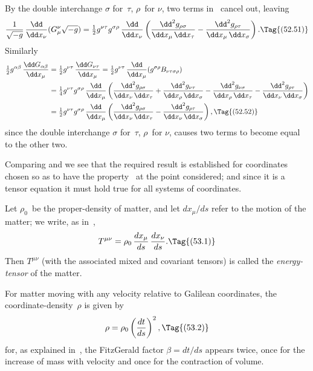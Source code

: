 \documentclass[12pt]{book}
\begin{document}
By the double interchange $\sigma$ for~$\tau$, $\rho$~for $\nu$, two terms in~ cancel out,
leaving
\[
\frac{1}{\sqrt{-g}}\, \frac{\dd}{\dd x_{\nu}} (G_{\mu}^{\nu} \sqrt{-g})
= \tfrac{1}{2} g^{\nu\tau} g^{\sigma\rho}\, \frac{\dd}{\dd x_{\nu}} \left(
    \frac{\dd^{2} g_{\rho\sigma}}{\dd x_{\mu}\, \dd x_{\tau}}
  - \frac{\dd^{2} g_{\rho\tau}}{\dd x_{\mu}\, \dd x_{\sigma}}\right).
\Tag{(52.51)}
\]
Similarly
\begin{align*}
  \tfrac{1}{2} g^{\alpha\beta}\, \frac{\dd G_{\alpha\beta}}{\dd x_{\mu}}
  &= \tfrac{1}{2} g^{\nu\tau}\, \frac{\dd G_{\nu\tau}}{\dd x_{\mu}}
  = \tfrac{1}{2} g^{\nu\tau}\, \frac{\dd}{\dd x_{\mu}} (g^{\sigma\rho} B_{\nu\tau\sigma\rho}) \\
  &= \tfrac{1}{4} g^{\nu\tau} g^{\sigma\rho}\, \frac{\dd}{\dd x_{\mu}}
  \left(\frac{\dd^{2} g_{\rho\sigma}}{\dd x_{\nu}\, \dd x_{\tau}}
  + \frac{\dd^{2} g_{\nu\tau}}{\dd x_{\rho}\, \dd x_{\sigma}}
  - \frac{\dd^{2} g_{\nu\sigma}}{\dd x_{\rho}\, \dd x_{\tau}}
  - \frac{\dd^{2} g_{\rho\tau}}{\dd x_{\nu}\, \dd x_{\sigma}}\right) \\
  &= \tfrac{1}{2} g^{\nu\tau} g^{\sigma\rho}\, \frac{\dd}{\dd x_{\mu}} \left(
    \frac{\dd^{2} g_{\rho\sigma}}{\dd x_{\nu}\, \dd x_{\tau}}
  - \frac{\dd^{2} g_{\rho\tau}}{\dd x_{\nu}\, \dd x_{\sigma}}\right),
  \Tag{(52.52)}
\end{align*}
since the double interchange $\sigma$ for~$\tau$, $\rho$~for $\nu$, causes two terms to become
equal to the other two.

Comparing  and  we see that the required result is established
for coordinates chosen so as to have the property~ at the point
considered; and since it is a tensor equation it must hold true for all systems
of coordinates.

%
%

Let $\rho_{0}$~be the proper-density of matter, and let $dx_{\mu}/ds$ refer to the motion
of the matter; we write, as in~,
\[
T^{\mu\nu} = \rho_{0}\, \frac{dx_{\mu}}{ds}\, \frac{dx_{\nu}}{ds}.
\Tag{(53.1)}
\]
Then $T^{\mu\nu}$ (with the associated mixed and covariant tensors) is called the
\emph{energy-tensor} of the matter.

For matter moving with any velocity relative to Galilean coordinates, the
coordinate-density~$\rho$ is given by
\[
\rho = \rho_{0} \left(\frac{dt}{ds}\right)^{2},
\Tag{(53.2)}
\]
for, as explained in~, the FitzGerald factor $\beta = dt/ds$ appears twice, once
for the increase of mass with velocity and once for the contraction of volume.
\end{document}

